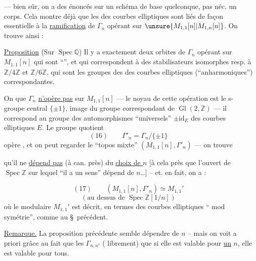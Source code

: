 
--- bien sûr, on a des énoncés  sur un schéma de base quelconque, pas néc. un corps. Cela montre déjà que les  des courbes elliptiques sont liés de façon essentielle à la \uline{ramification} de $\Gamma_n$ opérant sur $\unsure{M_{1,1}[n]|M_{1,n}[n]}$. On trouve ainsi :

\uline{Proposition} (Sur $\operatorname{Spec}\mathbb Q$) Il y a exactement deux orbites de $\Gamma_n$ opérant sur $M_{1,1}[n]$ qui sont ``'', et qui correspondent à des stabilisateurs isomorphes resp. à $\mathbb Z/4\mathbb Z$ et $\mathbb Z/6\mathbb Z$, qui sont les groupes des  des courbes elliptiques (``anharmoniques'') correspondantes.


On  que $\Gamma_n$ \uline{n'opère pas}  sur $M_{1,1}[n]$ --- le noyau de cette opération est le s-groupe central $\{\pm1\}$, image du groupe correspondant de $\operatorname{Gl}(2,\mathbb Z)$ --- il correspond au groupe des automorphismes ``universels'' $\pm\mathrm{id}_E$ des courbes elliptiques $E$. Le groupe quotient
\[
(16)\qquad \Gamma'_n=\Gamma_n/\{\pm1\}
\]
 opère , et on peut regarder le ``topos mixte'' $(M_{1,1}[n],\Gamma'_n)$ --- on trouve

qu'il ne \uline{dépend pas} (à  can. près) du \uline{choix de $n$} [à cela près que l'ouvert de $\operatorname{Spec}\mathbb Z$ sur lequel ``il a un sens'' dépend de $n$\dots] -- et. en fait, on a :


\[
(17)\qquad (M_{1,1}[n],\Gamma'_n)\simeq M_{1,1}'
\]
\[
(\text{au dessus de }\operatorname{Spec}\mathbb Z[1/n])
\]
où le   modulaire $M_{1,1}'$ est décrit, en termes des courbes elliptiques `` mod symétrie'', comme au \S\ précédent.

\uline{Remarque.} La proposition précédente semble dépendre de $n$ -- mais on voit a priori  grâce au fait que les $\Gamma_{n,n'}$  ( librement) que si elle est valable pour \uline{un} $n$, elle est valable pour tous.

